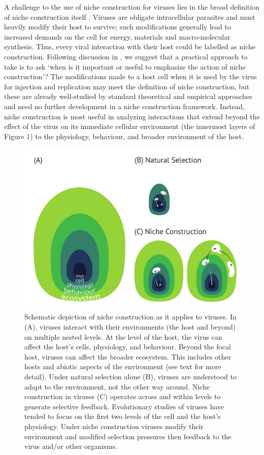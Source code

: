 \documentclass[review,draft,12pt]{elsarticle}
\begin{document}
A challenge to the use of niche construction for viruses lies in the
broad definition of niche construction itself
\citep{Scott-Phillips2014}. Viruses are obligate intracellular parasites
and must heavily modify their host to survive; such modifications
generally lead to increased demands on the cell for energy, materials
and macro-molecular synthesis. Thus, every viral interaction with their
host could be labelled as niche construction. Following discussion in
\citep{Scott-Phillips2014}, we suggest that a practical approach to take
is to ask `when is it important or useful to emphasize the action of
niche construction'? The modifications made to a host cell when it is
used by the virus for injection and replication may meet the definition
of niche construction, but these are already well-studied by standard
theoretical and empirical approaches and need no further development in
a niche construction framework. Instead, niche construction is most
useful in analyzing interactions that extend beyond the effect of the
virus on its immediate cellular environment (the innermost layers of
Figure 1) to the physiology, behaviour, and broader environment of the
host.

\begin{figure}[htbp]
\centering
\includegraphics{Figures/VNC-02-Figure1.pdf}
\caption{Schematic depiction of niche construction as it applies to
viruses. In (A), viruses interact with their environments (the host and
beyond) on multiple nested levels. At the level of the host, the virus
can affect the host's cells, physiology, and behaviour. Beyond the focal
host, viruses can affect the broader ecosystem. This includes other
hosts and abiotic aspects of the environment (see text for more detail).
Under natural selection alone (B), viruses are understood to adapt to
the environment, not the other way around. Niche construction in viruses
(C) operates across and within levels to generate selective feedback.
Evolutionary studies of viruses have tended to focus on the first two
levels of the cell and the host's physiology. Under niche construction
viruses modify their environment and modified selection pressures then
feedback to the virus and/or other organisms.}
\end{figure}
\end{document}
